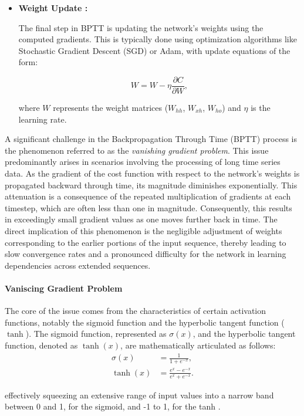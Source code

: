 \begin{itemize}
\item \textbf{Weight Update :}

The final step in BPTT is updating the network's weights using the computed gradients. 
This is typically done using optimization algorithms like Stochastic Gradient Descent (SGD) or Adam, with update equations of the form:

\[
W = W - \eta \frac{\partial C}{\partial W},
\]

where $W$ represents the weight matrices ($W_{hh}$, $W_{xh}$, $W_{ho}$) and $\eta$ is the learning rate.


\end{itemize}


A significant challenge in the Backpropagation Through Time (BPTT) process is the phenomenon referred to as the \textit{vanishing gradient problem}. 
This issue predominantly arises in scenarios involving the processing of long time series data. As the gradient of the cost function with respect to the network's weights is propagated backward through time, its magnitude diminishes exponentially. 
This attenuation is a consequence of the repeated multiplication of gradients at each timestep, which are often less than one in magnitude. Consequently, this results in exceedingly small gradient values as one moves further back in time. The direct implication of this phenomenon is the negligible adjustment of weights corresponding to the earlier portions of the input sequence, thereby leading to slow convergence rates and a pronounced difficulty for the network in learning dependencies across extended sequences.

\paragraph{Vaniscing Gradient Problem}

The core of the issue comes from the characteristics of certain activation functions, notably the sigmoid function and the hyperbolic tangent function (\(\tanh\)). 
The sigmoid function, represented as \(\sigma(x)\), and the hyperbolic tangent function, denoted as \(\tanh(x)\), are mathematically articulated as follows:
\begin{align}
\sigma(x) &= \frac{1}{1 + e^{-x}}, \\
\tanh(x) &= \frac{e^{x} - e^{-x}}{e^{x} + e^{-x}}.
\end{align}

effectively squeezing an extensive range of input values into a narrow band between 0 and 1, for the sigmoid, and -1 to 1, for the tanh . 

